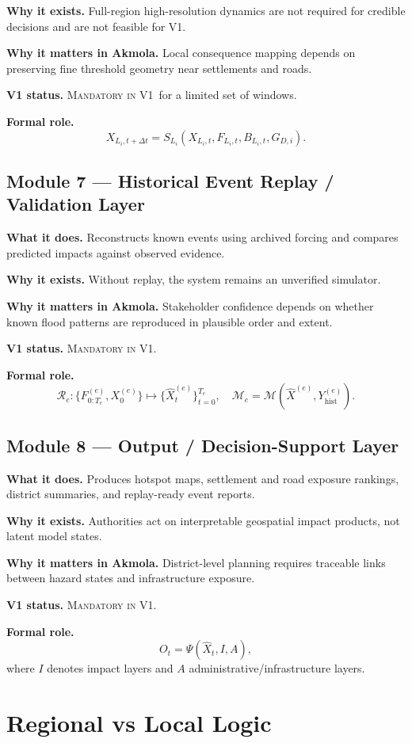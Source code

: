 \documentclass[11pt]{article}
\newcommand{\vone}{\textsc{Mandatory in V1}}
\begin{document}
\textbf{Why it exists.} Full-region high-resolution dynamics are not required for credible decisions and are not feasible for V1.

\textbf{Why it matters in Akmola.} Local consequence mapping depends on preserving fine threshold geometry near settlements and roads.

\textbf{V1 status.} \vone\ for a limited set of windows.

\textbf{Formal role.}
\[
X_{L_i,t+\Delta t}=S_{L_i}\!\left(X_{L_i,t},F_{L_i,t},B_{L_i,t},G_{D,i}\right).
\]

\subsection{Module 7 --- Historical Event Replay / Validation Layer}
\textbf{What it does.} Reconstructs known events using archived forcing and compares predicted impacts against observed evidence.

\textbf{Why it exists.} Without replay, the system remains an unverified simulator.

\textbf{Why it matters in Akmola.} Stakeholder confidence depends on whether known flood patterns are reproduced in plausible order and extent.

\textbf{V1 status.} \vone.

\textbf{Formal role.}
\[
\mathcal{R}_e:\{F^{(e)}_{0:T_e},X^{(e)}_0\}\mapsto \{\hat{X}^{(e)}_t\}_{t=0}^{T_e},
\quad
\mathcal{M}_e=\mathcal{M}\!\left(\hat{X}^{(e)},Y^{(e)}_{\mathrm{hist}}\right).
\]

\subsection{Module 8 --- Output / Decision-Support Layer}
\textbf{What it does.} Produces hotspot maps, settlement and road exposure rankings, district summaries, and replay-ready event reports.

\textbf{Why it exists.} Authorities act on interpretable geospatial impact products, not latent model states.

\textbf{Why it matters in Akmola.} District-level planning requires traceable links between hazard states and infrastructure exposure.

\textbf{V1 status.} \vone.

\textbf{Formal role.}
\[
O_t=\Psi(\hat{X}_t, I, A),
\]
where $I$ denotes impact layers and $A$ administrative/infrastructure layers.

\section{Regional vs Local Logic}
\end{document}
